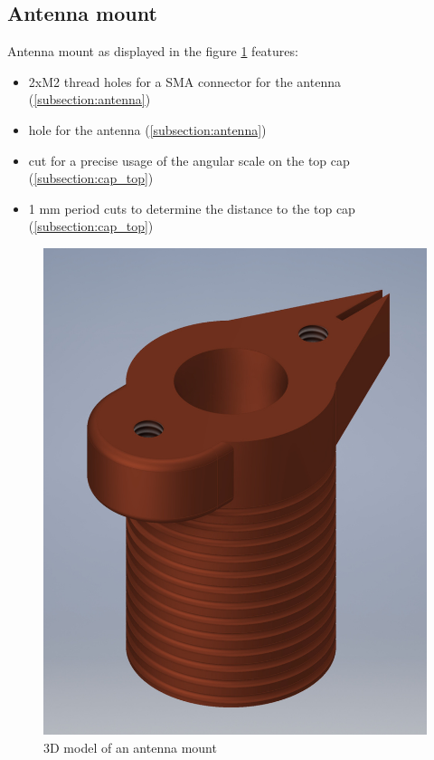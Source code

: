 \clearpage
\subsection{Antenna mount}
\label{subsection:antenna_mount}
Antenna mount as displayed in the figure \ref{fig:antenna_mount} features:
\begin{itemize}
	\item 2xM2 thread holes for a SMA connector for the antenna (\ref{subsection:antenna})
	\item hole for the antenna (\ref{subsection:antenna})
	\item cut for a precise usage of the angular scale on the top cap (\ref{subsection:cap_top})
	\item 1 mm period cuts to determine the distance to the top cap (\ref{subsection:cap_top})
\end{itemize}

\begin{figure}[h]
	\centering
	\includegraphics[width=.94\textwidth]{images/antenna_mount_small}
	\caption{3D model of an antenna mount}
	\label{fig:antenna_mount}
\end{figure}

